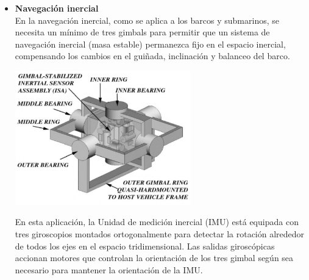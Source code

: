 \begin{itemize}
    \item \textbf{Navegación inercial}\\
    En la navegación inercial, como se aplica a los barcos y submarinos, se necesita 
    un mínimo de tres gimbals para permitir que un sistema de navegación inercial 
    (masa estable) permanezca fijo en el espacio inercial, compensando los cambios 
    en el guiñada, inclinación y balanceo del barco.
    \begin{center}
        \includegraphics[width=0.6\textwidth]{Capitulo1/Fig1.eps}       
        \label{Fig1}
    \end{center}
    En esta aplicación, la Unidad de medición inercial (IMU) está equipada con tres 
    giroscopios montados ortogonalmente para detectar la rotación alrededor de todos 
    los ejes en el espacio tridimensional. Las salidas giroscópicas accionan motores 
    que controlan la orientación de los tres gimbal según sea necesario para mantener 
    la orientación de la IMU.


\end{itemize}
